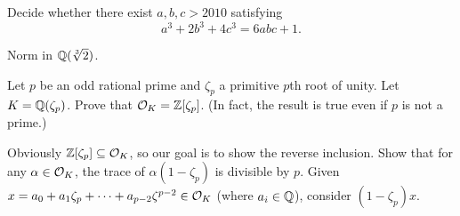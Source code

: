 \begin{problem}
	Decide whether there exist $a,b,c > 2010$ satisfying
	\[ a^3+2b^3+4c^3=6abc+1. \]
	\begin{hint}
		Norm in $\mathbb Q(\sqrt[3]2)$.
	\end{hint}
\end{problem}

\begin{dproblem}
	\yod
	\label{prob:ring_int_cyclotomic}
	Let $p$ be an odd rational prime and $\zeta_p$ a primitive $p$th root of unity.
	Let $K = \mathbb Q(\zeta_p)$.
	Prove that $\mathcal O_K = \mathbb Z[\zeta_p]$.
	(In fact, the result is true even if $p$ is not a prime.)
	\begin{hint}
		Obviously $\mathbb Z[\zeta_p] \subseteq \mathcal O_K$, so our goal is to show the reverse inclusion.
		Show that for any $\alpha \in \mathcal O_K$, the trace of $\alpha(1-\zeta_p)$ is divisible by $p$.
		Given $x = a_0 + a_1\zeta_p + \dots + a_{p-2}\zeta^{p-2} \in \mathcal O_K$ (where $a_i \in \mathbb Q$),
		consider $(1-\zeta_p)x$.
	\end{hint}
\end{dproblem}

